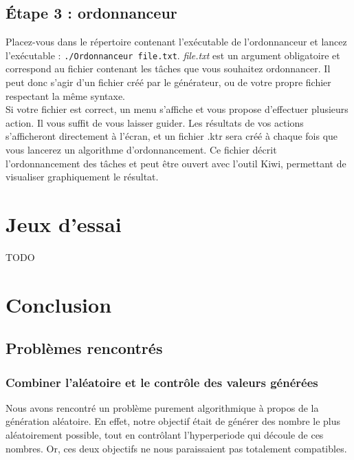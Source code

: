 		
	\section{Étape 3 : ordonnanceur}
	
		Placez-vous dans le répertoire contenant l'exécutable de l'ordonnanceur et lancez l'exécutable : \verb+./Ordonnanceur file.txt+. \emph{file.txt} est un argument obligatoire et correspond au fichier contenant les tâches que vous souhaitez ordonnancer. Il peut donc s'agir d'un fichier créé par le générateur, ou de votre propre fichier respectant la même syntaxe.\\
		
		Si votre fichier est correct, un menu s'affiche et vous propose d'effectuer plusieurs action. Il vous suffit de vous laisser guider. Les résultats de vos actions s'afficheront directement à l'écran, et un fichier .ktr sera créé à chaque fois que vous lancerez un algorithme d'ordonnancement. Ce fichier décrit l'ordonnancement des tâches et peut être ouvert avec l'outil Kiwi, permettant de visualiser graphiquement le résultat.


\chapter{Jeux d'essai}
{\Huge TODO }


\chapter{Conclusion}
	\section{Problèmes rencontrés}
		\subsection{Combiner l'aléatoire et le contrôle des valeurs générées}
			\label{sec:pb_aleatoire}
			Nous avons rencontré un problème purement algorithmique à propos de la génération aléatoire. En effet, notre objectif était de générer des nombre le plus aléatoirement possible, tout en contrôlant l'hyperperiode qui découle de ces nombres. Or, ces deux objectifs ne nous paraissaient pas totalement compatibles.\\
		
